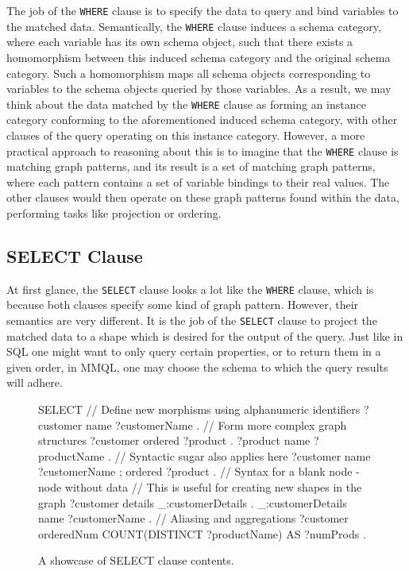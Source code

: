 The job of the \texttt{WHERE} clause is to specify the data to query and bind variables to the matched data.
Semantically, the \texttt{WHERE} clause induces a schema category, where each variable has its own schema object, such that there exists a homomorphism between this induced schema category and the original schema category.
Such a homomorphism maps all schema objects corresponding to variables to the schema objects queried by those variables.
As a result, we may think about the data matched by the \texttt{WHERE} clause as forming an instance category conforming to the aforementioned induced schema category, with other clauses of the query operating on this instance category.
However, a more practical approach to reasoning about this is to imagine that the \texttt{WHERE} clause is matching graph patterns, and its result is a set of matching graph patterns, where each pattern contains a set of variable bindings to their real values.
The other clauses would then operate on these graph patterns found within the data, performing tasks like projection or ordering.

\subsection{SELECT Clause}

At first glance, the \texttt{SELECT} clause looks a lot like the \texttt{WHERE} clause, which is because both clauses specify some kind of graph pattern.
However, their semantics are very different.
It is the job of the \texttt{SELECT} clause to project the matched data to a shape which is desired for the output of the query.
Just like in SQL one might want to only query certain properties, or to return them in a given order, in MMQL, one may choose the schema to which the query results will adhere.

\begin{figure}[ht]
\begin{code}
SELECT {
    // Define new morphisms using alphanumeric identifiers
    ?customer name ?customerName .
    // Form more complex graph structures
    ?customer ordered ?product .
    ?product name ?productName .
    // Syntactic sugar also applies here
    ?customer name ?customerName ;
        ordered ?product .
    // Syntax for a blank node - node without data
    // This is useful for creating new shapes in the graph
    ?customer details _:customerDetails .
    _:customerDetails name ?customerName .
    // Aliasing and aggregations
    ?customer orderedNum COUNT(DISTINCT ?productName) AS ?numProds .
}
\end{code}
\caption{A showcase of SELECT clause contents.}\label{mmql:figure:select}
\end{figure}

